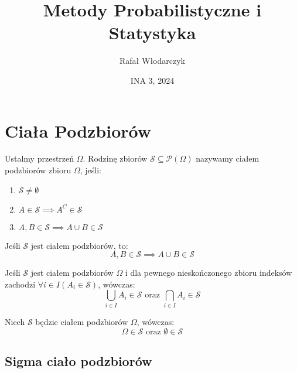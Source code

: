 \documentclass{article}
\title{Metody Probabilistyczne i Statystyka}
\author{Rafał Włodarczyk}
\date{INA 3, 2024}
\newenvironment{definition}[1]{%
    \trivlist
    \item[\hskip\labelsep\textbf{Definition. #1.}]
    \ignorespaces
}{%
    \endtrivlist
}
\newenvironment{fact}[1]{%
    \trivlist
    \item[\hskip\labelsep\textbf{Fact. #1.}]
    \ignorespaces
}{%
    \endtrivlist
}
\begin{document}
\maketitle

\tableofcontents

\section{Ciała Podzbiorów}

\begin{definition}{Ciało podzbiorów}
Ustalmy przestrzeń $\Omega$. Rodzinę zbiorów $\mathcal{S} \subseteq \mathcal{P}(\Omega)$ nazywamy ciałem podzbiorów zbioru $\Omega$, jeśli:
\begin{enumerate}
    \item \( \mathcal{S} \neq \emptyset \)
    \item \( A\in \mathcal{S} \implies A^{C} \in \mathcal{S} \)
    \item \( A, B \in \mathcal{S} \implies A \cup B \in \mathcal{S} \)
\end{enumerate}
\end{definition}

\begin{fact}{Przekrój w ciele podzbiorów}
Jeśli \( \mathcal{S} \) jest ciałem podzbiorów, to:
\[
A,B \in \mathcal{S} \implies A \cup B \in \mathcal{S}
\]  
\end{fact}

\begin{fact}{Skończony zbiór indeksów}
Jeśli \( \mathcal{S} \) jest ciałem podzbiorów \(\Omega\) i dla pewnego nieskończonego zbioru indeksów
zachodzi \(\forall i\in I (A_i \in \mathcal{S})\), wówczas:
\[
\bigcup_{i\in I} A_{i} \in \mathcal{S} \text {   oraz   } \bigcap_{i\in I} A_{i} \in \mathcal{S}
\]
\end{fact}

\begin{fact}{Omega i zbiór pusty}
Niech \(\mathcal{S}\) będzie ciałem podzbiorów \(\Omega\), wówczas:
\[
\Omega \in \mathcal{S} \text{   oraz   } \emptyset \in \mathcal{S}
\]
\end{fact}

\subsection{Sigma ciało podzbiorów}
\end{document}
